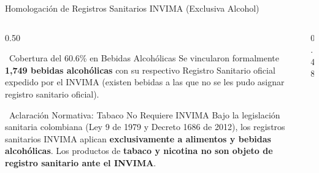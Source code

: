 \documentclass[aspectratio=169, 10pt]{beamer}
\begin{document}
\begin{frame}{Homologación de Registros Sanitarios INVIMA (Exclusiva Alcohol)}
    \begin{columns}[c]
        \begin{column}{0.50\textwidth}
            \begin{block}{\faCheckCircle\ Cobertura del 60.6\% en Bebidas Alcohólicas}
                \small Se vincularon formalmente \textbf{1,749 bebidas alcohólicas} con su respectivo Registro Sanitario oficial expedido por el INVIMA (existen bebidas a las que no se les pudo asignar registro sanitario oficial).
            \end{block}
            \vspace{0.15cm}
            \begin{alertblock}{\faInfoCircle\ Aclaración Normativa: Tabaco No Requiere INVIMA}
                \scriptsize Bajo la legislación sanitaria colombiana (Ley 9 de 1979 y Decreto 1686 de 2012), los registros sanitarios INVIMA aplican \textbf{exclusivamente a alimentos y bebidas alcohólicas}. Los productos de \textbf{tabaco y nicotina no son objeto de registro sanitario ante el INVIMA}.
            \end{alertblock}
            \vspace{0.15cm}

        \end{column}

        \begin{column}{0.48\textwidth}
            \begin{center}
\end{center}
\end{column}
\end{columns}
\end{frame}
\end{document}
